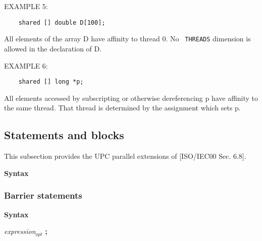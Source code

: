 \np EXAMPLE 5: 

\begin{verbatim}
    shared [] double D[100]; 
\end{verbatim}
    

   All elements of the array D have affinity to thread 0.  No {\tt
   THREADS} dimension is allowed in the declaration of D.

\np EXAMPLE 6: 

\begin{verbatim}
    shared [] long *p;
\end{verbatim}
    

   All elements accessed by subscripting or otherwise dereferencing
   p have affinity to the same thread.  That thread is determined by
   the assignment which sets p.

\subsection{Statements and blocks}

\npf This subsection provides the UPC parallel extensions of
    [ISO/IEC00 Sec. 6.8].

{\bf Syntax} 


\hspace{3em}{\em labeled-statement}

\hspace{3em}{\em compound-statement}

\hspace{3em}{\em expression-statement}

\hspace{3em}{\em selection-statement}

\hspace{3em}{\em iteration-statement}

\hspace{3em}{\em jump-statement}

\hspace{3em}{\em synchronization-statement}

\subsubsection{Barrier statements}
\label{upc_barrier}

{\bf Syntax} 


\hspace{3em}{\bf upc\_notify} {\em expression$_{opt}$} {\bf ;}

